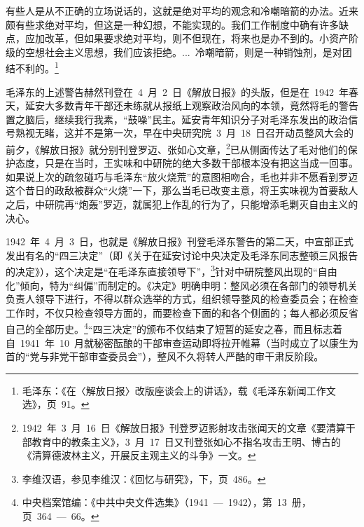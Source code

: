\begin{quoting}
有些人是从不正确的立场说话的，这就是绝对平均的观念和冷嘲暗箭的办法。近来颇有些求绝对平均，但这是一种幻想，不能实现的。我们工作制度中确有许多缺点，应加改革，但如果要求绝对平均，则不但现在，将来也是办不到的。小资产阶级的空想社会主义思想，我们应该拒绝。...~冷嘲暗箭，则是一种销蚀剂，是对团结不利的。\footnote{毛泽东：《在〈解放日报〉改版座谈会上的讲话》，载《毛泽东新闻工作文选》，页~91。}
\end{quoting}毛泽东的上述警告赫然刊登在~4~月~2~日《解放日报》的头版，但是在~1942~年春天，延安大多数青年干部还未练就从报纸上观察政治风向的本领，竟然将毛的警告置之脑后，继续我行我素，“鼓噪”民主。延安青年知识分子对毛泽东发出的政治信号熟视无睹，这并不是第一次，早在中央研究院~3~月~18~日召开动员整风大会的前夕，《解放日报》就分别刊登罗迈、张如心文章，\footnote{1942~年~3~月~16~日《解放日报》刊登罗迈影射攻击张闻天的文章《要清算干部教育中的教条主义》，3~月~17~日又刊登张如心不指名攻击王明、博古的《清算德波林主义，开展反主观主义的斗争》一文。}已从侧面传达了毛对他们的保护态度，只是在当时，王实味和中研院的绝大多数干部根本没有把这当成一回事。如果说上次的疏忽碰巧与毛泽东“放火烧荒”的意图相吻合，毛也并非不愿看到罗迈这个昔日的政敌被群众“火烧”一下，那么当毛已改变主意，将王实味视为首要敌人之后，中研院再“炮轰”罗迈，就属犯上作乱的行为了，只能增添毛剿灭自由主义的决心。

1942~年~4~月~3~日，也就是《解放日报》刊登毛泽东警告的第二天，中宣部正式发出有名的“四三决定”（即《关于在延安讨论中央决定及毛泽东同志整顿三风报告的决定》），这个决定是“在毛泽东直接领导下”，\footnote{李维汉语，参见李维汉：《回忆与研究》，下，页~486。}针对中研院整风出现的“自由化”倾向，特为“纠偏”而制定的。《决定》明确申明：整风必须在各部门的领导机关负责人领导下进行，不得以群众选举的方式，组织领导整风的检查委员会；在检查工作时，不仅只检查领导方面的，而要检查下面的和各个侧面的；每人都必须反省自己的全部历史。\footnote{中央档案馆编：《中共中央文件选集》（1941~—~1942），第~13~册，页~364~—~66。}“四三决定”的颁布不仅结束了短暂的延安之春，而且标志着自~1941~年~10~月就秘密酝酿的干部审查运动即将拉开帷幕（当时成立了以康生为首的“党与非党干部审查委员会”），整风不久将转人严酷的审干肃反阶段。

